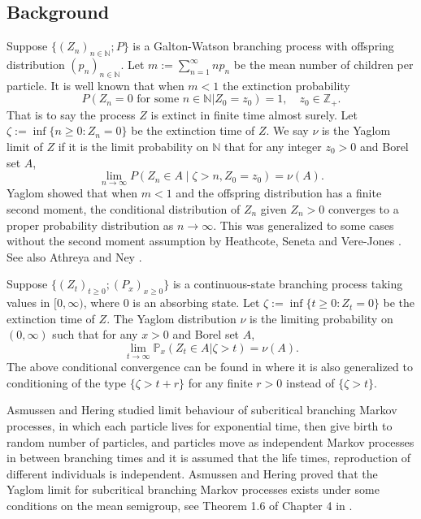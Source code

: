 \documentclass[12pt,a4paper]{amsart}
\numberwithin{equation}{section}
\theoremstyle{plain}
\theoremstyle{definition}
\theoremstyle{remark}
\begin{document}
\subsection{Background}\label{sec:BGD}
	Suppose 
	$\{(Z_n)_{n\in \mathbb N}; P\}$
	is a Galton-Watson branching process with offspring distribution 
	$(p_n)_{n\in \mathbb N}$.
	Let $m:=\sum^{\infty}_{n=1}np_n$ be the mean number of children per particle. 
	It is well known that when $m<1$ the extinction probability 
	\[
	P(Z_n = 0 \text{ for some $n \in \mathbb N$} | Z_0 = z_0) = 1, \quad z_0 \in \mathbb Z_+.
	\] 
	That is to say the process $Z$ is extinct in finite time almost surely. Let $\zeta:=\inf\{n\geq 0: Z_n=0\}$ be the extinction time of $Z$. 
	We say $\nu$ is the Yaglom limit of $Z$ if it is the limit probability on $\mathbb N$ that for any integer
	$z_0>0$ and Borel set $A$,
\[
	\lim_{n\rightarrow\infty} P\left(Z_n\in A\middle|\zeta>n , Z_0 = z_0\right)=\nu(A).
\]
	Yaglom \cite{Yaglom47} showed that when $m < 1$ and the offspring distribution has a finite second moment, the conditional distribution  of $Z_n$ given $Z_n>0$ converges to a proper probability distribution as $n\to\infty$. 
	This was generalized to some cases without the second moment assumption by Heathcote, Seneta and Vere-Jones \cite{Heathcote}. See also Athreya and Ney \cite[pages 64-65]{AthreyaNey1972Branching}.

	Suppose $\{(Z_t)_{t \geq 0}; (P_x)_{x\geq 0}\}$  is a  continuous-state branching process taking values in $[0,\infty)$, where $0$ is an absorbing state.  Let $\zeta:=\inf\{t\geq 0: Z_t=0\}$ be the extinction time of $Z$.
	The Yaglom distribution $\nu$ is the limiting probability on $(0,\infty)$ such that for any $x>0$ and Borel set $A$,
\[
	\lim_{t\rightarrow\infty}\mathbb P_x(Z_t\in A\big|\zeta>t)=\nu(A).
\]
	The above conditional convergence can be found in \cite[Theorem 4.3]{Li00} where it is also generalized to conditioning of the type $\{\zeta>t+r\}$ for any finite $r>0$ instead of $\{\zeta>t\}$.

	Asmussen and Hering \cite{AH} studied limit behaviour of subcritical branching Markov processes, in which each particle lives for exponential time, then give birth to random number of particles, and particles move as independent Markov processes in between branching times and it is assumed that  the life times, reproduction of different individuals is independent.
	Asmussen and Hering proved that the Yaglom limit for subcritical  branching Markov processes exists under some conditions on the mean semigroup, see Theorem 1.6 of Chapter 4 in \cite{AH}.
\end{document}
